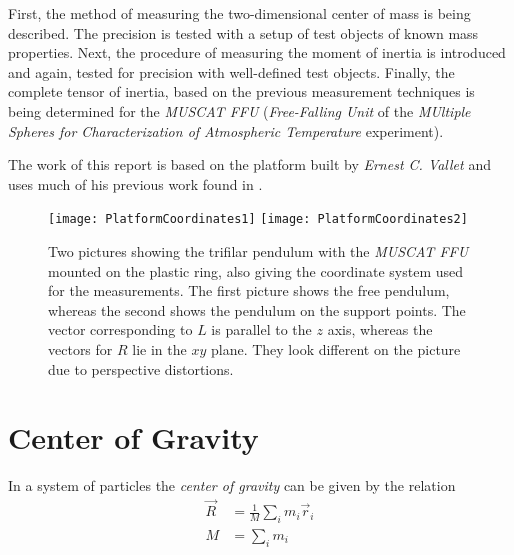 \documentclass[journal]{IEEEtran}
\begin{document}
First, the method of measuring the two-dimensional center of mass is being described. The precision is tested with a setup of test objects of known mass properties.
Next, the procedure of measuring the moment of inertia is introduced and again, tested for precision with well-defined test objects.
Finally, the complete tensor of inertia, based on the previous measurement techniques is being determined for the \emph{MUSCAT FFU} (\emph{Free-Falling Unit} of the \emph{MUltiple Spheres for Characterization of Atmospheric Temperature} experiment).

The work of this report is based on the platform built by \emph{Ernest C. Vallet} and uses much of his previous work found in \cite{report:ernest}.

% 
% 
% 
% 

\begin{figure*}
	\centering
	\texttt{[image: PlatformCoordinates1]}
	\texttt{[image: PlatformCoordinates2]}
	\caption{Two pictures showing the trifilar pendulum with the \emph{MUSCAT FFU} mounted on the plastic ring, also giving the coordinate system used for the measurements. The first picture shows the free pendulum, whereas the second shows the pendulum on the support points. The vector corresponding to $L$ is parallel to the $z$ axis, whereas the vectors for $R$ lie in the $xy$ plane. They look different on the picture due to perspective distortions.}
	\label{fig:Platform}
\end{figure*}

\section{Center of Gravity}

In a system of particles the \emph{center of gravity} can be given by the relation \cite{book:goldstein}
\begin{align}
	\vec{R} & = \frac{1}{M} \sum_{i} m_i \vec{r}_i \\
	\label{eq:SystemCoG}
	M & = \sum_{i} m_i
\end{align}
\end{document}
